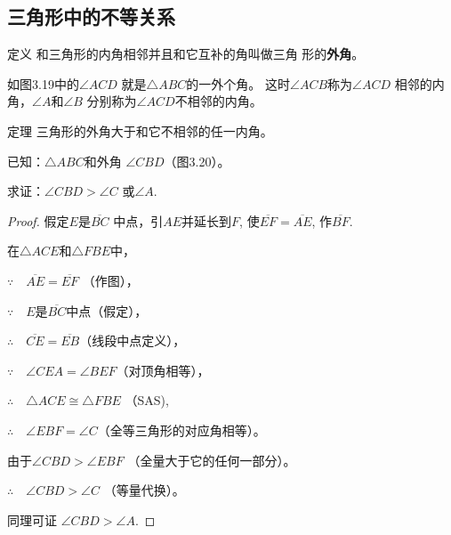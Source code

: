 \subsection{三角形中的不等关系}
\begin{blk}{定义}
    和三角形的内角相邻并且和它互补的角叫做三角
形的\textbf{外角}。
\end{blk}
 
如图3.19中的$\angle ACD$
就是$\triangle ABC$的一外个角。
这时$\angle ACB$称为$\angle ACD$
相邻的内角，$\angle A$和$\angle B$
分别称为$\angle ACD$不相邻的内角。

\begin{blk}{定理}
 三角形的外角大于和它不相邻的任一内角。
\end{blk}

\begin{figure}[htp]\centering
    \begin{minipage}[t]{0.48\textwidth}
    \centering
{}
    \caption{}
    \end{minipage}
    \begin{minipage}[t]{0.48\textwidth}
    \centering
    \caption{}
    \end{minipage}
    \end{figure}

已知：$\triangle ABC$和外角
$\angle CBD$（图3.20）。

求证：$\angle CBD>\angle C$
或$\angle A$.

\begin{proof}
    假定$E$是$\overline{BC}$
中点，引$AE$并延长到$F$, 
使$\overline{EF}=\overline{AE}$, 作$\overline{BF}$.

在$\triangle ACE$和$\triangle FBE$中，

$\because\quad \overline{AE}=\overline{EF}$ （作图），

$\because\quad E$是$\overline{BC}$中点（假定），

$\therefore\quad \overline{CE}=\overline{EB}$（线段中点定义），

$\because\quad \angle CEA=\angle BEF$（对顶角相等），

$\therefore\quad \triangle ACE\cong \triangle FBE$ （SAS),

$\therefore\quad \angle EBF=\angle C$（全等三角形的对应角相等）。

由于$\angle CBD>\angle EBF$ （全量大于它的任何一部分）。

$\therefore\quad \angle CBD>\angle C$ （等量代换）。

同理可证 $\angle CBD> \angle A$.
\end{proof}


